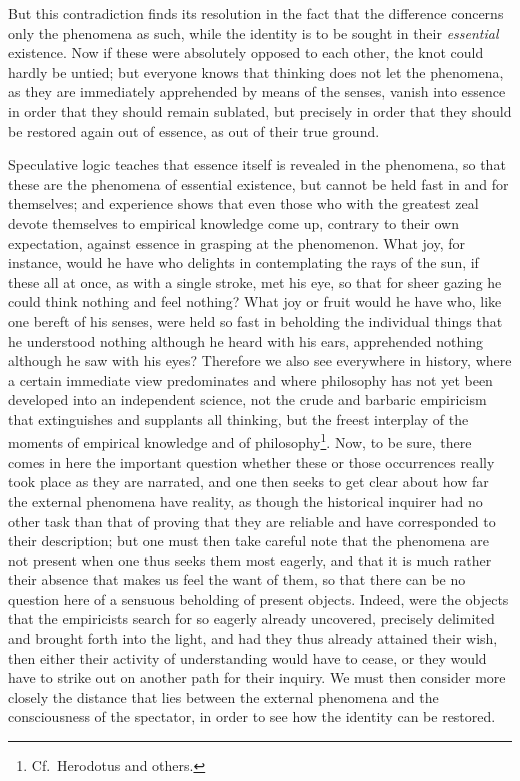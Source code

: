 \documentclass[12pt]{book}
\newcommand{\opage}[1]{\marginnote{\footnotesize\textit{[#1]}}}
\begin{document}
But this contradiction finds its resolution in the fact that the difference
concerns only the phenomena as such, while the identity is to be sought in
their \emph{essential} existence. Now if these were absolutely opposed to each
other, the knot could hardly be untied; but everyone knows that thinking does
not let the phenomena, as they are immediately apprehended by means of the
senses, vanish into essence in order that they should remain sublated, but
precisely in order that they should be restored again out of essence, as out of
their true ground.

Speculative logic teaches that essence itself is revealed in the phenomena, so
that these are the phenomena of essential existence, but cannot be held fast in
and for themselves; and experience shows that even those who with the greatest
zeal devote
\opage{12} \setcounter{footnote}{0}%
themselves to empirical knowledge come up, contrary to their own expectation,
against essence in grasping at the phenomenon. What joy, for instance, would he
have who delights in contemplating the rays of the sun, if these all at once,
as with a single stroke, met his eye, so that for sheer gazing he could think
nothing and feel nothing? What joy or fruit would he have who, like one bereft
of his senses, were held so fast in beholding the individual things that he
understood nothing although he heard with his ears, apprehended nothing although
he saw with his eyes? Therefore we also see everywhere in history, where a
certain immediate view predominates and where philosophy has not yet been
developed into an independent science, not the crude and barbaric empiricism
that extinguishes and supplants all thinking, but the freest interplay of the
moments of empirical knowledge and of philosophy\footnote{Cf.\ Herodotus and
others.}. Now, to be sure, there comes in here the important question whether
these or those occurrences really took place as they are narrated, and one then
seeks to get clear about how far the external phenomena have reality, as though
the historical inquirer had no other task than that of proving that they are
reliable and have corresponded to their description; but one must then take
careful note that the phenomena are not present when one thus seeks them most
eagerly, and that it is much rather their absence that makes us feel the want
of them, so that there can be no question here of a sensuous beholding of
present objects. Indeed, were the objects that the empiricists search for so
eagerly already uncovered, precisely delimited and brought forth into the
light, and had they thus already attained their wish, then either their
activity of understanding would have to cease, or they would have to strike out
on another path for their inquiry.
\opage{13} %
We must then consider more closely the distance that lies between the external
phenomena and the consciousness of the spectator, in order to see how the
identity can be restored.
\end{document}
